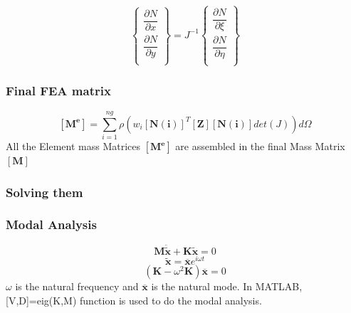\documentclass[9pt]{beamer}
\begin{document}
\begin{frame}
\begin{equation}
\left\{
\begin{array}{r}
\dfrac{\partial N }{ \partial x }  \\
\dfrac{\partial N }{ \partial y }  \\
\end{array}
\right\}
=
J^{-1}
\left\{
\begin{array}{r}
\dfrac{\partial N }{ \partial \xi }  \\
\dfrac{\partial N }{ \partial \eta }  \\
\end{array}
\right\}
\end{equation}
\end{frame}

\begin{frame}
\frametitle{Final FEA matrix}
\begin{equation*}
\left[ \mathbf{M^e}  \right] 
=
\sum_{i = 1}^{ng}
\rho\left(w_i
\left[ \mathbf{N(i)}  \right]^T
\left[ \mathbf{Z}  \right]
\left[ \mathbf{N(i)}  \right] 
det(J)\right)  d \Omega
\end{equation*}
All the Element mass Matrices $\left[ \mathbf{M^e}  \right]$ are assembled in the final Mass Matrix $\left[ \mathbf{M} \right]$
\end{frame}


\begin{frame}
\frametitle{Solving them}
\end{frame}


\begin{frame}
\frametitle{Modal Analysis}
\begin{equation*}
\mathbf{M}\mathbf{\ddot{\tilde{ x}}}+\mathbf{K}\mathbf{\tilde{ x}}=0
\end{equation*}
\begin{equation*}
\tilde{ \mathbf{x}}=\overline{ \mathbf{x}}e^{i\omega t}
\end{equation*}
\begin{equation*}
\left( \mathbf{K} - \omega^2 \mathbf{K}  \right) \overline{\mathbf{x} } = 0
\end{equation*}
$\omega$ is the natural frequency and $\overline{\mathbf{x}}$ is the natural mode. In MATLAB, [V,D]=eig(K,M) function is used to do the modal analysis.
\end{frame}
\end{document}
